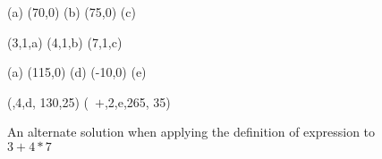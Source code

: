 



\begin {figure}
\Draw



\MarkLoc(a)
\Move(70,0)
\MarkLoc(b)
\Move(75,0)
\MarkLoc(c)

\boxItDefault(3,1,a)
\boxItDefault(4,1,b)
\boxItDefault(7,1,c)

\MoveToLoc(a)
\Move(115,0)
\MarkLoc(d)
\Move(-10,0)
\MarkLoc(e)

\boxIt(\hspace{15pt}\hfill*\hspace{10pt}\hfill,4,d, 130,25)
\boxIt(~$  +  $\hspace{150pt}\hfill,2,e,265, 35)

\EndDraw


\caption {An alternate solution 
when applying the definition of 
expression to $3+4*7$ }
\label {fig:exprsBoxedAmb2}

\end {figure}


